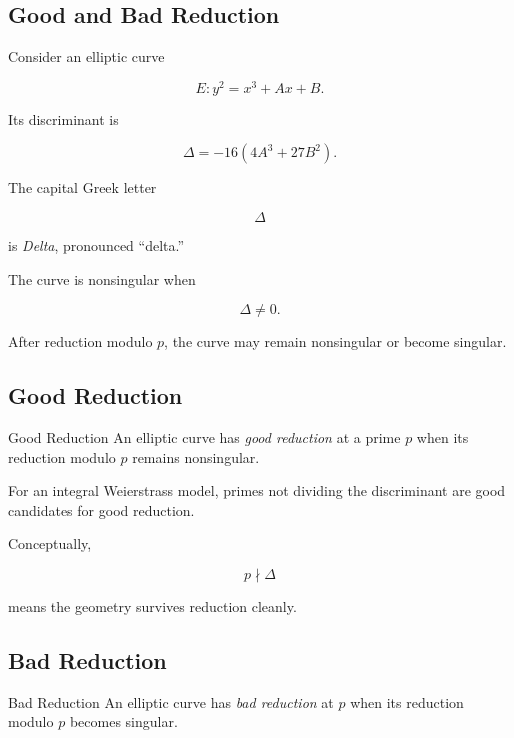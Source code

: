 \subsection{Good and Bad Reduction}
\label{subsec:good-bad-reduction}

Consider an elliptic curve

\[ E:y^2=x^3+Ax+B. \]

Its discriminant is

\[ \boxed{\Delta=-16(4A^3+27B^2).} \]

The capital Greek letter

\[ \Delta \]

is \emph{Delta}, pronounced ``delta.''

The curve is nonsingular when

\[ \Delta\neq0. \]

After reduction modulo \(p\), the curve may remain nonsingular or become
singular.

\subsection{Good Reduction}
\label{subsec:good-reduction}

\begin{definitionbox}{Good Reduction}
An elliptic curve has \emph{good reduction} at a prime \(p\) when its
reduction modulo \(p\) remains nonsingular.
\end{definitionbox}

For an integral Weierstrass model, primes not dividing the discriminant are
good candidates for good reduction.

Conceptually,

\[ p\nmid\Delta \]

means the geometry survives reduction cleanly.

\subsection{Bad Reduction}
\label{subsec:bad-reduction}

\begin{definitionbox}{Bad Reduction}
An elliptic curve has \emph{bad reduction} at \(p\) when its reduction modulo
\(p\) becomes singular.
\end{definitionbox}

